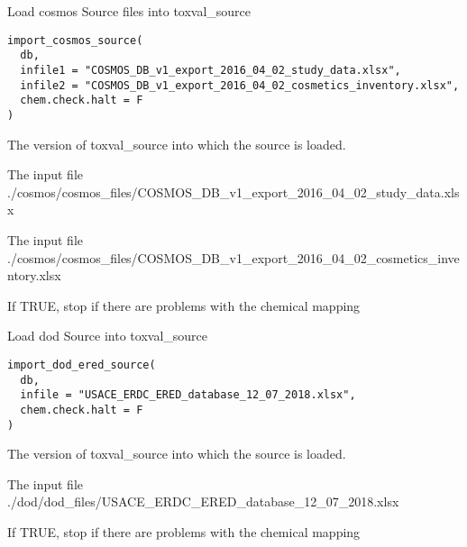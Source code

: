\documentclass[letterpaper]{book}
\begin{document}
%
\begin{Description}\relax
Load cosmos Source files into toxval\_source
\end{Description}
%
\begin{Usage}
\begin{verbatim}
import_cosmos_source(
  db,
  infile1 = "COSMOS_DB_v1_export_2016_04_02_study_data.xlsx",
  infile2 = "COSMOS_DB_v1_export_2016_04_02_cosmetics_inventory.xlsx",
  chem.check.halt = F
)
\end{verbatim}
\end{Usage}
%
\begin{Arguments}
\begin{ldescription}
\item[\code{db}] The version of toxval\_source into which the source is loaded.

\item[\code{infile1}] The input file ./cosmos/cosmos\_files/COSMOS\_DB\_v1\_export\_2016\_04\_02\_study\_data.xlsx

\item[\code{infile2}] The input file ./cosmos/cosmos\_files/COSMOS\_DB\_v1\_export\_2016\_04\_02\_cosmetics\_inventory.xlsx

\item[\code{chem.check.halt}] If TRUE, stop if there are problems with the chemical mapping
\end{ldescription}
\end{Arguments}
%
\begin{Description}\relax
Load dod Source into toxval\_source
\end{Description}
%
\begin{Usage}
\begin{verbatim}
import_dod_ered_source(
  db,
  infile = "USACE_ERDC_ERED_database_12_07_2018.xlsx",
  chem.check.halt = F
)
\end{verbatim}
\end{Usage}
%
\begin{Arguments}
\begin{ldescription}
\item[\code{db}] The version of toxval\_source into which the source is loaded.

\item[\code{infile}] The input file ./dod/dod\_files/USACE\_ERDC\_ERED\_database\_12\_07\_2018.xlsx

\item[\code{chem.check.halt}] If TRUE, stop if there are problems with the chemical mapping
\end{ldescription}
\end{Arguments}
\end{document}

